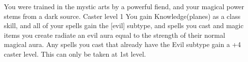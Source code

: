  {}
\descfeat
{You were trained in the mystic arts by a powerful fiend, and your magical power stems from a dark source.}
{Caster level 1}
{You gain Knowledge(planes) as a class skill, and all of your spells gain the [evil] subtype, and spells you cast and magic items you create radiate an evil aura equal to the strength of their normal magical aura. Any spells you cast that already have the Evil subtype gain a +4 caster level.}
{This can only be taken at 1st level.}
